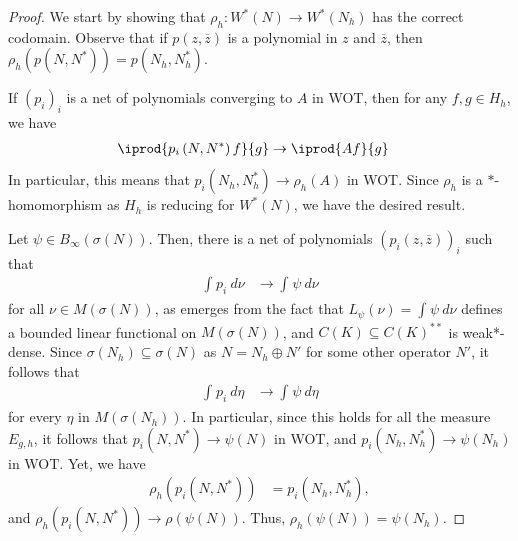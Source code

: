 \documentclass[10pt]{mypackage}
\begin{document}
\begin{proof}
  We start by showing that $\rho_h\colon W^{\ast}\left( N \right)\to W^{\ast}\left( N_h \right)$ has the correct codomain. Observe that if $p\left( z, \overline{z} \right)$ is a polynomial in $z$ and $ \overline{z} $, then $\rho_h\left( p\left( N,N^{\ast} \right) \right) = p\left( N_h,N_h^{\ast} \right)$.

  If $\left( p_i \right)_i$ is a net of polynomials converging to $A$ in WOT, then for any $f,g\in H_h$, we have
  \begin{align*}
    \iprod{p_i\left( N,N^{\ast} \right)f}{g} &\to \iprod{Af}{g}
  \end{align*}
  In particular, this means that $p_i\left( N_h,N_h^{\ast} \right)\to \rho_h\left( A \right)$ in WOT. Since $\rho_h$ is a $\ast$-homomorphism as $H_h$ is reducing for $W^{\ast}\left( N \right)$, we have the desired result.

  Let $\psi\in B_{\infty}\left( \sigma\left( N \right) \right)$. Then, there is a net of polynomials $\left( p_i\left( z, \overline{z} \right) \right)_{i}$ such that
  \begin{align*}
    \int_{}^{} p_i\:d\nu &\to \int_{}^{} \psi\:d\nu
  \end{align*}
  for all $\nu\in M\left( \sigma\left( N \right) \right)$, as emerges from the fact that $L_{\psi}\left( \nu \right) = \int_{}^{} \psi\:d\nu$ defines a bounded linear functional on $M\left( \sigma\left( N \right) \right)$, and $C\left( K \right)\subseteq C\left( K \right)^{\ast\ast}$ is weak*-dense. Since $\sigma\left( N_h \right)\subseteq \sigma\left( N \right)$ as $N = N_h\oplus N'$ for some other operator $N'$, it follows that
  \begin{align*}
    \int_{}^{} p_i\:d\eta &\to \int_{}^{} \psi\:d\eta
  \end{align*}
  for every $\eta$ in $M\left( \sigma\left( N_h \right) \right)$. In particular, since this holds for all the measure $E_{g,h}$, it follows that $p_i\left( N,N^{\ast} \right)\to \psi\left( N \right)$ in WOT, and $p_i\left( N_h,N_h^{\ast} \right)\to \psi\left( N_h \right)$ in WOT. Yet, we have
  \begin{align*}
    \rho_h\left( p_i\left( N,N^{\ast} \right) \right) &= p_i\left( N_h,N_h^{\ast} \right),
  \end{align*}
  and $\rho_h\left( p_i\left( N,N^{\ast} \right) \right)\to \rho\left( \psi\left( N \right) \right)$. Thus, $\rho_h\left( \psi\left( N \right) \right) = \psi\left( N_h \right)$.


\end{proof}
\end{document}
